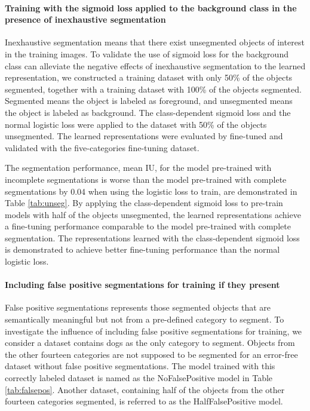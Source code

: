 \paragraph{Training with the sigmoid loss applied to the background class in the presence of inexhaustive segmentation}
Inexhaustive segmentation means that there exist unsegmented objects of interest in the training images.
To validate the use of sigmoid loss for the background class can alleviate the negative effects of inexhaustive segmentation to the learned representation, we constructed a training dataset with only 50\% of the objects segmented, together with a training dataset with 100\% of the objects segmented.
Segmented means the object is labeled as foreground, and unsegmented means the object is labeled as background.
The class-dependent sigmoid loss and the normal logistic loss were applied to the dataset with 50\% of the objects unsegmented.
The learned representations were evaluated by fine-tuned and validated with the five-categories fine-tuning dataset.

The segmentation performance, mean IU, for the model pre-trained with incomplete segmentations is worse than the model pre-trained with complete segmentations by 0.04 when using the logistic loss to train, are demonstrated in Table \ref{tab:unseg}.
By applying the class-dependent sigmoid loss to pre-train models with half of the objects unsegmented, the learned representations achieve a fine-tuning performance comparable to the model pre-trained with complete segmentation.
The representations learned with the class-dependent sigmoid loss is demonstrated to achieve better fine-tuning performance than the normal logistic loss.



\paragraph{Including false positive segmentations for training if they present}
False positive segmentations represents those segmented objects that are semantically meaningful but not from a pre-defined category to segment.
To investigate the influence of including false positive segmentations for training, we consider a dataset contains dogs as the only category to segment.
Objects from the other fourteen categories are not supposed to be segmented for an error-free dataset without false positive segmentations.
The model trained with this correctly labeled dataset is named as the NoFalsePositive model in Table \ref{tab:falsepos}.
Another dataset, containing half of the objects from the other fourteen categories segmented, is referred to as the HalfFalsePositive model.

